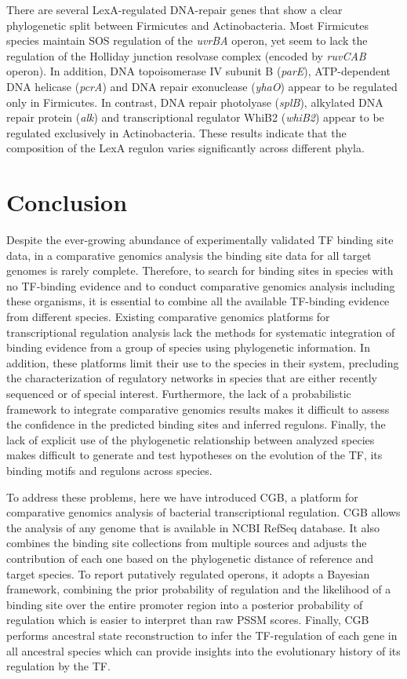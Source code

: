  There are several LexA-regulated DNA-repair genes that show a clear
 phylogenetic split between Firmicutes and Actinobacteria. Most Firmicutes
 species maintain SOS regulation of the \textit{uvrBA} operon, yet seem to lack
 the regulation of the Holliday junction resolvase complex (encoded by
 \textit{ruvCAB} operon). In addition, DNA topoisomerase IV subunit B
 (\textit{parE}), ATP-dependent DNA helicase (\textit{pcrA}) and DNA repair
 exonuclease (\textit{yhaO}) appear to be regulated only in Firmicutes. In
 contrast, DNA repair photolyase (\textit{splB}), alkylated DNA repair protein
 (\textit{alk}) and transcriptional regulator WhiB2 (\textit{whiB2}) appear to
 be regulated exclusively in Actinobacteria. These results indicate that the
 composition of the LexA regulon varies significantly across different phyla.





\section{Conclusion}

Despite the ever-growing abundance of experimentally validated TF binding site
data, in a comparative genomics analysis the binding site data for all target
genomes is rarely complete. Therefore, to search for binding sites in species
with no TF-binding evidence and to conduct comparative genomics analysis
including these organisms, it is essential to combine all the available
TF-binding evidence from different species. Existing comparative genomics
platforms for transcriptional regulation analysis lack the methods for
systematic integration of binding evidence from a group of species using
phylogenetic information. In addition, these platforms limit their use to the
species in their system, precluding the characterization of regulatory networks
in species that are either recently sequenced or of special
interest. Furthermore, the lack of a probabilistic framework to integrate
comparative genomics results makes it difficult to assess the confidence in the
predicted binding sites and inferred regulons. Finally, the lack of explicit
use of the phylogenetic relationship between analyzed species makes difficult
to generate and test hypotheses on the evolution of the TF, its binding motifs
and regulons across species.

To address these problems, here we have introduced CGB, a platform for
comparative genomics analysis of bacterial transcriptional regulation. CGB
allows the analysis of any genome that is available in NCBI RefSeq
database. It also combines the binding site collections from multiple sources
and adjusts the contribution of each one based on the phylogenetic distance of
reference and target species. To report putatively regulated operons, it adopts
a Bayesian framework, combining the prior probability of regulation and the
likelihood of a binding site over the entire promoter region into a posterior
probability of regulation which is easier to interpret than raw PSSM
scores. Finally, CGB performs ancestral state reconstruction to infer the
TF-regulation of each gene in all ancestral species which can provide insights
into the evolutionary history of its regulation by the TF\@.

